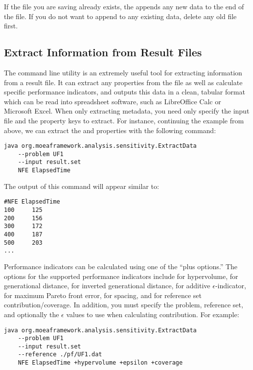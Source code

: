 \begin{important}
If the file you are saving already exists, the  appends any new data to the end of the file.  If you do not want to append to any existing data, delete any old file first.
\end{important}

\subsection{Extract Information from Result Files}
The  command line utility is an extremely useful tool for extracting information from a result file.  It can extract any properties from the file as well as calculate specific performance indicators, and outputs this data in a clean, tabular format which can be read into spreadsheet software, such as LibreOffice Calc or Microsoft Excel.  When only extracting metadata, you need only specify the input file and the property keys to extract.  For instance, continuing the example from above, we can extract the  and  properties with the following command:

\begin{lstlisting}[language=Plaintext]
java org.moeaframework.analysis.sensitivity.ExtractData
    --problem UF1
    --input result.set
    NFE ElapsedTime
\end{lstlisting}

The output of this command will appear similar to:

\begin{lstlisting}[language=Plaintext]
#NFE ElapsedTime
100     125
200     156
300     172
400     187
500     203
...
\end{lstlisting}

Performance indicators can be calculated using one of the ``plus options.''  The options for the supported performance indicators include  for hypervolume,  for generational distance,  for inverted generational distance,  for additive $\epsilon$-indicator,  for maximum Pareto front error,  for spacing, and  for reference set contribution/coverage.  In addition, you must specify the problem, reference set, and optionally the $\epsilon$ values to use when calculating contribution.  For example:

\begin{lstlisting}[language=Plaintext]
java org.moeaframework.analysis.sensitivity.ExtractData
    --problem UF1
    --input result.set
    --reference ./pf/UF1.dat
    NFE ElapsedTime +hypervolume +epsilon +coverage
\end{lstlisting}


